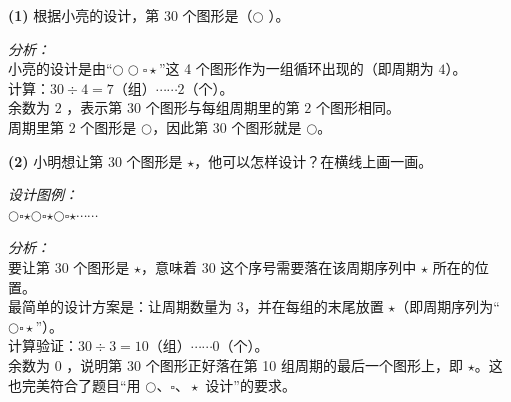 {\small
\textbf{(1)} 根据小亮的设计，第 30 个图形是（\quad \textbf{$\bigcirc$} \quad）。

\vspace{0.3cm}
\textit{分析：}\\
小亮的设计是由“$\bigcirc \bigcirc \square \star$”这 4 个图形作为一组循环出现的（即周期为 $4$）。\\
计算：$30 \div 4 = 7$（组）$\cdots\cdots 2$（个）。\\
余数为 $2$ ，表示第 $30$ 个图形与每组周期里的第 $2$ 个图形相同。\\
周期里第 $2$ 个图形是 $\bigcirc$，因此第 $30$ 个图形就是 $\bigcirc$。

\vspace{0.8cm}
\textbf{(2)} 小明想让第 30 个图形是 $\star$，他可以怎样设计？在横线上画一画。

\vspace{0.3cm}
\textit{设计图例：}\\
\underline{\quad \Large $\bigcirc$\quad$\square$\quad$\star$\quad$\bigcirc$\quad$\square$\quad$\star$\quad$\bigcirc$\quad$\square$\quad$\star$\quad$\cdots\cdots$ \quad}

\vspace{0.6cm}
\textit{分析：}\\
要让第 $30$ 个图形是 $\star$，意味着 $30$ 这个序号需要落在该周期序列中 $\star$ 所在的位置。\\
最简单的设计方案是：让周期数量为 $3$，并在每组的末尾放置 $\star$（即周期序列为“$\bigcirc\square\star$”）。\\
计算验证：$30 \div 3 = 10$（组）$\cdots\cdots 0$（个）。\\
余数为 $0$ ，说明第 $30$ 个图形正好落在第 10 组周期的最后一个图形上，即 $\star$。这也完美符合了题目“用 $\bigcirc、\square、\star$ 设计”的要求。
}



